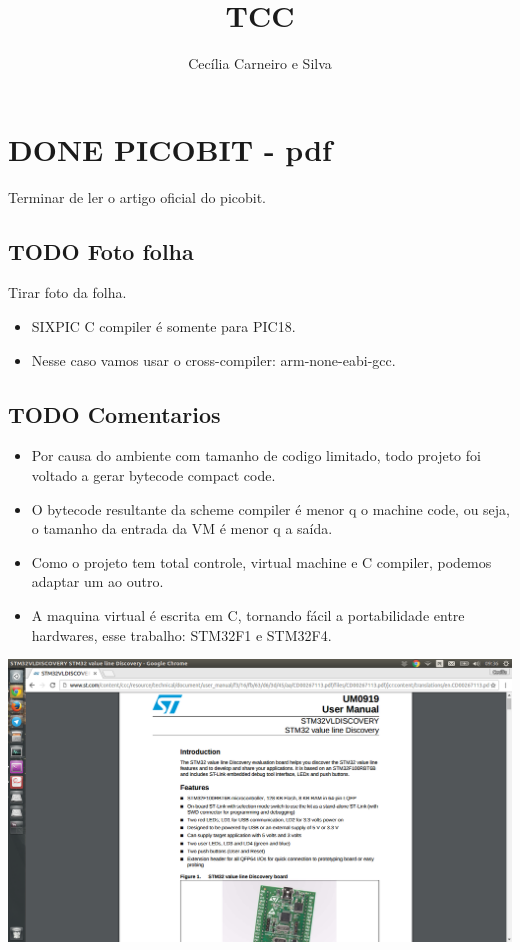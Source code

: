 \documentclass[11pt]{article}
\author{Cecília Carneiro e Silva}
\date{}
\title{TCC}
\begin{document}
\maketitle
\tableofcontents


\section{{\bfseries\sffamily DONE} PICOBIT - pdf}
\label{sec-1}

Terminar de ler o artigo oficial do picobit.

\subsection{{\bfseries\sffamily TODO} Foto folha}
\label{sec-1-1}

Tirar foto da folha.

\begin{itemize}
\item SIXPIC C compiler é somente para PIC18.
\item Nesse caso vamos usar o cross-compiler: arm-none-eabi-gcc.
\end{itemize}

\subsection{{\bfseries\sffamily TODO} Comentarios}
\label{sec-1-2}

\begin{itemize}
\item Por causa do ambiente com tamanho de codigo limitado, todo projeto foi voltado a gerar bytecode compact code.
\item O bytecode resultante da scheme compiler é menor q o machine code, ou seja, o tamanho da entrada da VM é menor q a saída.
\item Como o projeto tem total controle, virtual machine e C compiler, podemos adaptar um ao outro.
\item A maquina virtual é escrita em C, tornando fácil a portabilidade entre hardwares, esse trabalho: STM32F1 e STM32F4.
\end{itemize}

\includegraphics[width=.9\linewidth]{stm32f1.png}
\end{document}
